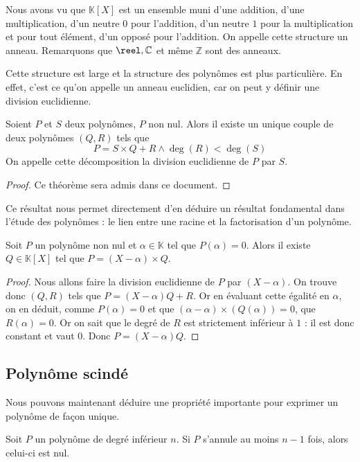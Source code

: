 Nous avons vu que $\mathbb K [X]$ est un ensemble muni d'une addition, d'une multiplication, d'un neutre $0$ pour l'addition, d'un neutre $1$ pour la multiplication et pour tout élément, d'un opposé pour l'addition. On appelle cette structure un anneau. Remarquons que $\reel,\mathbb C$ et même $\mathbb Z$ sont des anneaux.

Cette structure est large et la structure des polynômes est plus particulière. En effet, c'est ce qu'on appelle un anneau euclidien, car on peut y définir une division euclidienne.

\begin{them}
    Soient $P$ et $S$ deux polynômes, $P$ non nul. Alors il existe un unique couple de deux polynômes $(Q,R)$ tels que $$P=S\times Q + R \land \deg(R) < \deg(S)$$ On appelle cette décomposition la division euclidienne de $P$ par $S$.
\end{them}

\begin{proof}
    Ce théorème sera admis dans ce document.
\end{proof}

Ce résultat nous permet directement d'en déduire un résultat fondamental dans l'étude des polynômes : le lien entre une racine et la factorisation d'un polynôme.

\begin{prop}
    Soit $P$ un polynôme non nul et $\alpha\in\mathbb K$ tel que $P(\alpha)=0$. Alors il existe $Q\in\mathbb K[X]$ tel que $P=(X-\alpha)\times Q$.
\end{prop}
\begin{proof}
    Nous allons faire la division euclidienne de $P$ par $(X-\alpha)$. On trouve donc $(Q,R)$ tels que $P=(X-\alpha)Q+R$. Or en évaluant cette égalité en $\alpha$, on en déduit, comme $P(\alpha)=0$ et que $(\alpha-\alpha)\times (Q(\alpha))=0$, que $R(\alpha)=0$. Or on sait que le degré de $R$ est strictement inférieur à $1$ : il est donc constant et vaut $0$. Donc $P=(X-\alpha)Q$.
\end{proof}

\subsection{Polynôme scindé}

Nous pouvons maintenant déduire une propriété importante pour exprimer un polynôme de façon unique.

\begin{prop}
    Soit $P$ un polynôme de degré inférieur $n$. Si $P$ s'annule au moins $n-1$ fois, alors celui-ci est nul.
\end{prop}

